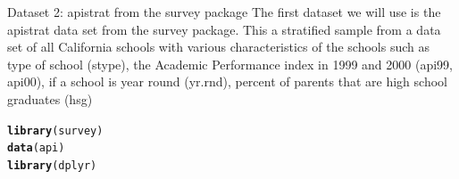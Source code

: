 \documentclass{beamer}\usepackage[]{graphicx}\usepackage[]{color}
\makeatletter
\newcommand{\hlopt}[1]{\textcolor[rgb]{0,0,0}{#1}}%
\newcommand{\hlstd}[1]{\textcolor[rgb]{0.345,0.345,0.345}{#1}}%
\newcommand{\hlkwb}[1]{\textcolor[rgb]{0.69,0.353,0.396}{#1}}%
\newcommand{\hlkwc}[1]{\textcolor[rgb]{0.333,0.667,0.333}{#1}}%
\newcommand{\hlkwd}[1]{\textcolor[rgb]{0.737,0.353,0.396}{\textbf{#1}}}%
\newenvironment{kframe}{%
 \def\at@end@of@kframe{}%
 \ifinner\ifhmode%
  \def\at@end@of@kframe{\end{minipage}}%
  \begin{minipage}{\columnwidth}%
 \fi\fi%
 \def\FrameCommand##1{\hskip\@totalleftmargin \hskip-\fboxsep
 \colorbox{shadecolor}{##1}\hskip-\fboxsep
     \hskip-\linewidth \hskip-\@totalleftmargin \hskip\columnwidth}%
 \MakeFramed {\advance\hsize-\width
   \@totalleftmargin\z@ \linewidth\hsize
   \@setminipage}}%
 {\par\unskip\endMakeFramed%
 \at@end@of@kframe}
\newenvironment{knitrout}{}{} %
\makeatother
\begin{document}
\begin{frame}[fragile]{Dataset 2: apistrat from the survey package}
The first dataset we will use is the apistrat data set from the survey package.  This a stratified sample from a data set of all California schools with various characteristics of the schools such as type of school (stype), the Academic Performance index in 1999 and 2000 (api99, api00), if a school is year round (yr.rnd), percent of parents that are high school graduates (hsg)
\begin{knitrout}
\color{fgcolor}\begin{kframe}
\begin{alltt}
\hlkwd{library}\hlstd{(survey)}
\hlkwd{data}\hlstd{(api)}
\hlkwd{library}\hlstd{(dplyr)}
\end{alltt}
\end{kframe}
\end{knitrout}
\end{frame}

\end{document}
